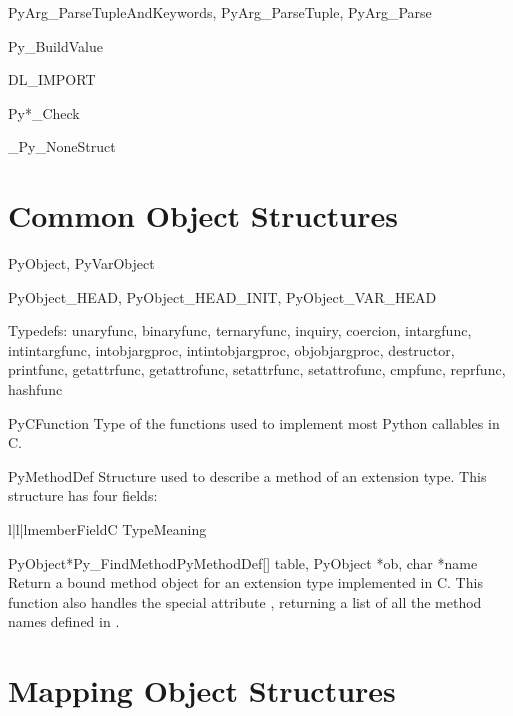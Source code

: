 \documentclass{manual}
\begin{document}
PyArg_ParseTupleAndKeywords, PyArg_ParseTuple, PyArg_Parse

Py_BuildValue

DL_IMPORT

Py*_Check

_Py_NoneStruct


\section{Common Object Structures \label{common-structs}}

PyObject, PyVarObject

PyObject_HEAD, PyObject_HEAD_INIT, PyObject_VAR_HEAD

Typedefs:
unaryfunc, binaryfunc, ternaryfunc, inquiry, coercion, intargfunc,
intintargfunc, intobjargproc, intintobjargproc, objobjargproc,
destructor, printfunc, getattrfunc, getattrofunc, setattrfunc,
setattrofunc, cmpfunc, reprfunc, hashfunc

\begin{ctypedesc}{PyCFunction}
Type of the functions used to implement most Python callables in C.
\end{ctypedesc}

\begin{ctypedesc}{PyMethodDef}
Structure used to describe a method of an extension type.  This
structure has four fields:

\begin{tableiii}{l|l|l}{member}{Field}{C Type}{Meaning}
\end{tableiii}
\end{ctypedesc}

\begin{cfuncdesc}{PyObject*}{Py_FindMethod}{PyMethodDef[] table,
                                            PyObject *ob, char *name}
Return a bound method object for an extension type implemented in C.
This function also handles the special attribute ,
returning a list of all the method names defined in .
\end{cfuncdesc}


\section{Mapping Object Structures \label{mapping-structs}}
\end{document}
